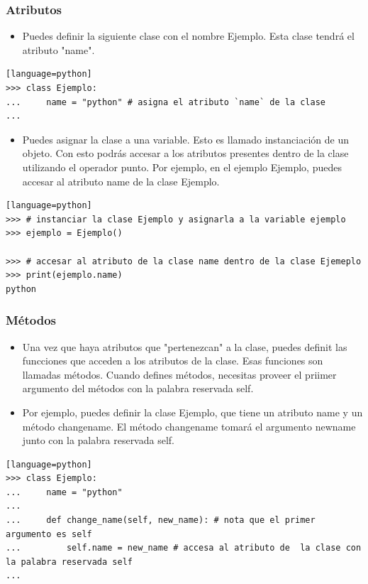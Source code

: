 \documentclass[hyperref={pdfpagelabels=false},xcolor=pst,pdf,fragile]{beamer}
\begin{document}
\begin{frame}[fragile]
    \frametitle{Atributos}
    \pause
    \begin{itemize}
    \item Puedes definir la siguiente clase con el nombre Ejemplo. Esta clase tendrá el atributo "name".
    \end{itemize}
    \begin{lstlisting}[basicstyle=\tiny][language=python]
>>> class Ejemplo:
...     name = "python" # asigna el atributo `name` de la clase
...
    \end{lstlisting}
    \begin{itemize}
    \item Puedes asignar la clase a una variable. Esto es llamado instanciación de un objeto. Con esto podrás accesar a los atributos presentes dentro de la clase utilizando el operador punto. Por ejemplo, en el ejemplo Ejemplo, puedes accesar al atributo name de la clase Ejemplo.
    \end{itemize}
    \begin{lstlisting}[basicstyle=\tiny][language=python]
>>> # instanciar la clase Ejemplo y asignarla a la variable ejemplo
>>> ejemplo = Ejemplo()

>>> # accesar al atributo de la clase name dentro de la clase Ejemeplo
>>> print(ejemplo.name)
python
    \end{lstlisting}
    
\end{frame}

\begin{frame}[fragile]
    \frametitle{Métodos}
    \pause
    \begin{itemize}
    \item Una vez que haya atributos que "pertenezcan" a la clase, puedes definit las funcciones que acceden a los atributos de la clase. Esas funciones son llamadas métodos. Cuando defines métodos, necesitas proveer el priimer argumento del métodos con la palabra reservada self.
    \item Por ejemplo, puedes definir la clase Ejemplo, que tiene un atributo name y un método change\textunderscore name. El método change\textunderscore name tomará el argumento new\textunderscore name junto con la palabra reservada self.
    \end{itemize}
    \begin{lstlisting}[basicstyle=\tiny][language=python]
>>> class Ejemplo:
...     name = "python"
...     
...     def change_name(self, new_name): # nota que el primer argumento es self
...         self.name = new_name # accesa al atributo de  la clase con la palabra reservada self
...
    \end{lstlisting}
\end{frame}
\end{document}
